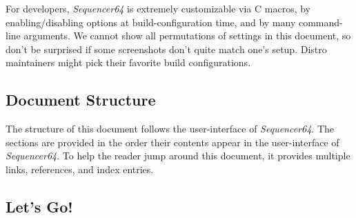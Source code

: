 \documentclass[
 11pt,
 twoside,
 a4paper,
 headinclude,
 footinclude,
 final                                 %
]{article}
\begin{document}

   For developers, \textsl{Sequencer64} is extremely customizable via C macros,
   by enabling/disabling options at build-configuration time, and by many
   command-line arguments.  We cannot show all permutations of settings in this
   document, so don't be surprised if some screenshots don't quite match
   one's setup.  Distro maintainers might pick their favorite build
   configurations.

\subsection{Document Structure}
\label{subsec:introduction_document_structure}

   The structure of this document follows the user-interface of
   \textsl{Sequencer64}.  The sections are provided in the order
   their contents appear in the user-interface of \textsl{Sequencer64}.  To
   help the reader jump around this document, it provides
   multiple links, references, and index entries.

%
%
%

\subsection{Let's Go!}
\label{subsec:introduction_lets_get_started}
\end{document}

